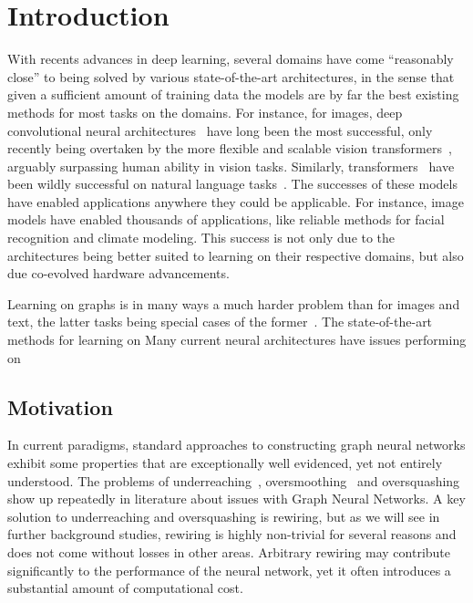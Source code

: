 \documentclass[../main.tex]{subfiles}
\begin{document}
    \chapter{Introduction}\label{ch:introduction}
    With recents advances in deep learning, several domains have come ``reasonably close'' to being solved by various state-of-the-art architectures, in the sense that given a sufficient amount of training data the models are by far the best existing methods for most tasks on the domains.
    For instance, for images, deep convolutional neural architectures~\cite{lecunGradientbasedLearningApplied1998} have long been the most successful, only recently being overtaken by the more flexible and scalable vision transformers~\cite{dosovitskiyImageWorth16x162021}, arguably surpassing human ability in vision tasks.
    Similarly, transformers~\cite{vaswaniAttentionAllYou2017} have been wildly successful on natural language tasks~\cite{brownLanguageModelsAre2020}.
    The successes of these models have enabled applications anywhere they could be applicable.
    For instance, image models have enabled thousands of applications, like reliable methods for facial recognition and climate modeling.
    This success is not only due to the architectures being better suited to learning on their respective domains, but also due co-evolved hardware advancements.

    Learning on graphs is in many ways a much harder problem than for images and text, the latter tasks being special cases of the former~\cite{bronsteinGeometricDeepLearning2021}.
    The state-of-the-art methods for learning on
    Many current neural architectures have issues performing on

    \section{Motivation}\label{sec:motivation}
    In current paradigms, standard approaches to constructing graph neural networks exhibit some properties that are exceptionally well evidenced, yet not entirely understood.
    The problems of underreaching~\cite{alonBottleneckGraphNeural2021}, oversmoothing~\cite{chenMeasuringRelievingOversmoothing2019} and oversquashing~\cite{alonBottleneckGraphNeural2021, toppingUnderstandingOversquashingBottlenecks2022} show up repeatedly in literature about issues with Graph Neural Networks.
    A key solution to underreaching and oversquashing is rewiring, but as we will see in further background studies, rewiring is highly non-trivial for several reasons and does not come without losses in other areas.
    Arbitrary rewiring may contribute significantly to the performance of the neural network, yet it often introduces a substantial amount of computational cost.
\end{document}
